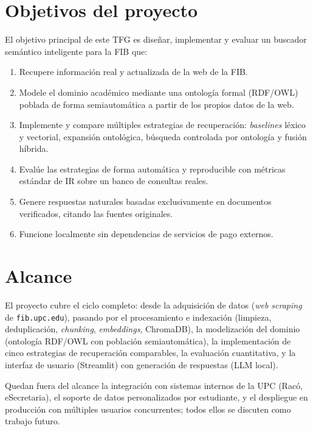 \documentclass[12pt, a4paper, twoside]{report}
\begin{document}
\section{Objetivos del proyecto}

El objetivo principal de este TFG es dise\~nar, implementar y evaluar un buscador sem\'antico inteligente para la FIB que:

\begin{enumerate}
  \item Recupere informaci\'on real y actualizada de la web de la FIB.
  \item Modele el dominio acad\'emico mediante una ontolog\'ia formal (RDF/OWL) poblada de forma semiautom\'atica a partir de los propios datos de la web.
  \item Implemente y compare m\'ultiples estrategias de recuperaci\'on: \textit{baselines} l\'exico y vectorial, expansi\'on ontol\'ogica, b\'usqueda controlada por ontolog\'ia y fusi\'on h\'ibrida.
  \item Eval\'ue las estrategias de forma autom\'atica y reproducible con m\'etricas est\'andar de IR sobre un banco de consultas reales.
  \item Genere respuestas naturales basadas exclusivamente en documentos verificados, citando las fuentes originales.
  \item Funcione localmente sin dependencias de servicios de pago externos.
\end{enumerate}

\section{Alcance}

El proyecto cubre el ciclo completo: desde la adquisici\'on de datos (\textit{web scraping} de \texttt{fib.upc.edu}), pasando por el procesamiento e indexaci\'on (limpieza, deduplicaci\'on, \textit{chunking}, \textit{embeddings}, ChromaDB), la modelizaci\'on del dominio (ontolog\'ia RDF/OWL con poblaci\'on semiautom\'atica), la implementaci\'on de cinco estrategias de recuperaci\'on comparables, la evaluaci\'on cuantitativa, y la interfaz de usuario (Streamlit) con generaci\'on de respuestas (LLM local).

Quedan fuera del alcance la integraci\'on con sistemas internos de la UPC (Rac\'o, eSecretaria), el soporte de datos personalizados por estudiante, y el despliegue en producci\'on con m\'ultiples usuarios concurrentes; todos ellos se discuten como trabajo futuro.
\end{document}

